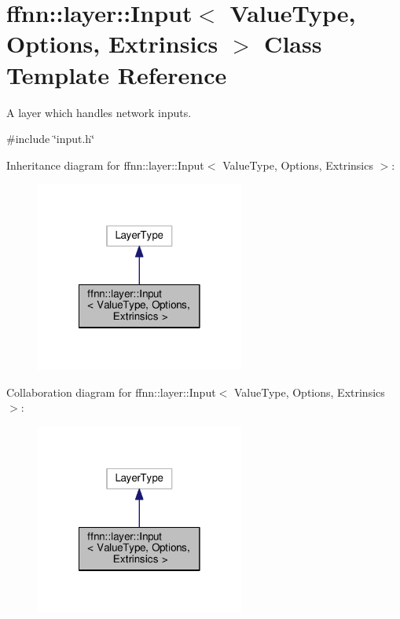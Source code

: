 \hypertarget{classffnn_1_1layer_1_1_input}{\section{ffnn\-:\-:layer\-:\-:Input$<$ Value\-Type, Options, Extrinsics $>$ Class Template Reference}
\label{classffnn_1_1layer_1_1_input}
}


A layer which handles network inputs.  




{\ttfamily \#include \char`\"{}input.\-h\char`\"{}}



Inheritance diagram for ffnn\-:\-:layer\-:\-:Input$<$ Value\-Type, Options, Extrinsics $>$\-:
\nopagebreak
\begin{figure}[H]
\begin{center}
\leavevmode
\includegraphics[width=194pt]{classffnn_1_1layer_1_1_input__inherit__graph}
\end{center}
\end{figure}


Collaboration diagram for ffnn\-:\-:layer\-:\-:Input$<$ Value\-Type, Options, Extrinsics $>$\-:
\nopagebreak
\begin{figure}[H]
\begin{center}
\leavevmode
\includegraphics[width=194pt]{classffnn_1_1layer_1_1_input__coll__graph}
\end{center}
\end{figure}
